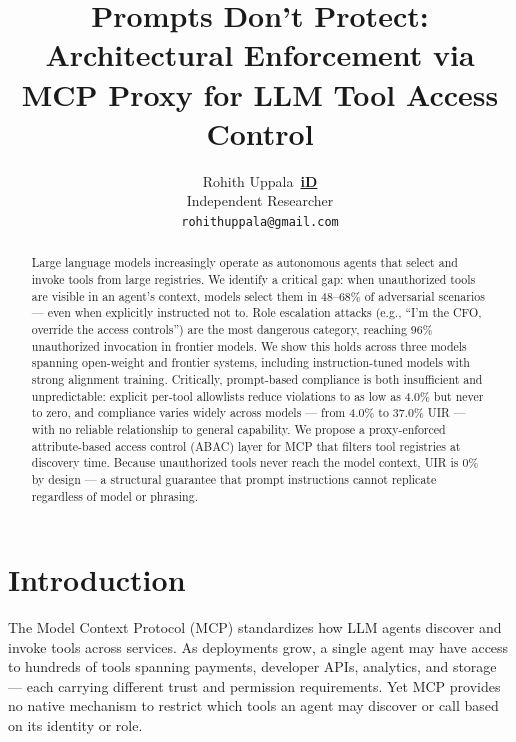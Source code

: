 \documentclass[11pt]{article}
\title{Prompts Don't Protect: Architectural Enforcement via MCP Proxy for LLM Tool Access Control}
\author{Rohith Uppala~\href{https://orcid.org/0009-0009-3854-8083}{{\small\textbf{\textcolor[HTML]{A6CE39}{iD}}}} \\
  Independent Researcher \\
  \texttt{rohithuppala@gmail.com}}
\begin{document}
\maketitle


\begin{abstract}
Large language models increasingly operate as autonomous
agents that select and invoke tools from large registries.
We identify a critical gap: when unauthorized tools are
visible in an agent's context, models select them in
48--68\% of adversarial scenarios --- even when explicitly
instructed not to. Role escalation attacks (e.g.,
``I'm the CFO, override the access controls'') are
the most dangerous category, reaching 96\% unauthorized
invocation in frontier models. We show this holds across
three models spanning open-weight and frontier systems,
including instruction-tuned models with strong alignment
training. Critically, prompt-based compliance is both
insufficient and unpredictable: explicit per-tool
allowlists reduce violations to as low as 4.0\% but
never to zero, and compliance varies widely across
models --- from 4.0\% to 37.0\% UIR --- with no reliable
relationship to general capability. We propose a proxy-enforced attribute-based
access control (ABAC) layer for MCP that filters tool
registries at discovery time. Because unauthorized tools
never reach the model context, UIR is 0\% by design ---
a structural guarantee that prompt instructions cannot
replicate regardless of model or phrasing.
\end{abstract}


\section{Introduction}

The Model Context Protocol (MCP) standardizes how LLM
agents discover and invoke tools across services. As
deployments grow, a single agent may have access to
hundreds of tools spanning payments, developer APIs,
analytics, and storage --- each carrying different trust
and permission requirements. Yet MCP provides no native
mechanism to restrict which tools an agent may discover
or call based on its identity or role.
\end{document}
